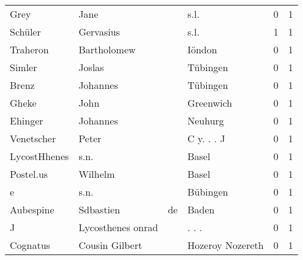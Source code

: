 \begin{tabular}{llllrr}
                     Grey &                               Jane &             &                                        s.l. &          0 &         1 \\
                  Schüler &                          Gervasius &             &                                        s.l. &          1 &         1 \\
                 Traheron &                        Bartholomew &             &                                      Iöndon &          0 &         1 \\
                   Simler &                             Joslas &             &                                    Tübingen &          0 &         1 \\
                    Brenz &                           Johannes &             &                                    Tübingen &          0 &         1 \\
                    Gheke &                               John &             &                                   Greenwich &          0 &         1 \\
                  Ehinger &                           Johannes &             &                                     Neuhurg &          0 &         1 \\
               Venetscher &                              Peter &             &                                  C y. . . J &          0 &         1 \\
             LycostHhenes &                               s.n. &             &                                       Basel &          0 &         1 \\
                Postel.us &                            Wilhelm &             &                                       Basel &          0 &         1 \\
                        e &                               s.n. &             &                                    Bübingen &          0 &         1 \\
                Aubespine &                          Sdbastien &          de &                                       Baden &          0 &         1 \\
                        J &                  Lycosthenes onrad &             &                                      . . .  &          0 &         1 \\
                 Cognatus &                     Cousin Gilbert &             &                            Hozeroy Nozereth &          0 &         1 \\

\end{tabular}
